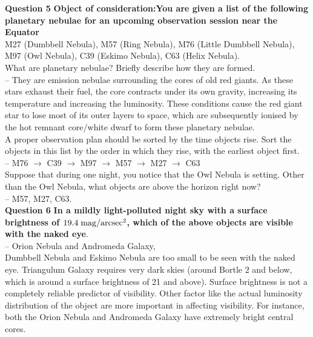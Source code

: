 \documentclass[a4paper,12pt]{extarticle}
\begin{document}
\textsf{\textbf{Question 5}} \textbf{Object of consideration:You are given a list of the following planetary nebulae for an upcoming observation session near the Equator} \\

M27 (Dumbbell Nebula), M57 (Ring Nebula), M76 (Little Dumbbell Nebula), M97 (Owl Nebula), C39 (Eskimo Nebula), C63 (Helix Nebula).\\

What are planetary nebulae? Briefly describe how they are formed.\\
-- They are emission nebulae surrounding the cores of old red giants. As these stars exhaust their fuel, the core contracts under its own gravity, increasing its temperature and
increasing the luminosity. These conditions cause the red giant star to lose most of its outer layers to space, which are subsequently ionised by the hot remnant core/white dwarf to form these planetary nebulae.\\

A proper observation plan should be sorted by the time objects rise. Sort the objects in this list by the order in which they rise, with the earliest object first.\\
-- M76 $\rightarrow$ C39 $\rightarrow$ M97 $\rightarrow$ M57 $\rightarrow$ M27 $\rightarrow$ C63\\

Suppose that during one night, you notice that the Owl Nebula is
setting. Other than the Owl Nebula, what objects are above the
horizon right now?\\
-- M57, M27, C63.\\

\textsf{\textbf{Question 6}} \textbf{In a mildly light-polluted night sky with a surface brightness of $19.4\; \rm mag/arcsec^2$, which of the above objects are visible with the naked eye}.\\
-- Orion Nebula and Andromeda Galaxy,\\

Dumbbell Nebula and Eskimo Nebula are too small to be seen with the naked eye. Triangulum Galaxy requires very dark skies (around Bortle 2 and below, which is around a surface brightness of 21 and above). Surface brightness is not a completely reliable predictor of visibility. Other factor like the actual luminosity distribution of the object are more important in affecting visibility. For instance, both the Orion Nebula and Andromeda Galaxy have extremely bright central cores.\\
\end{document}
